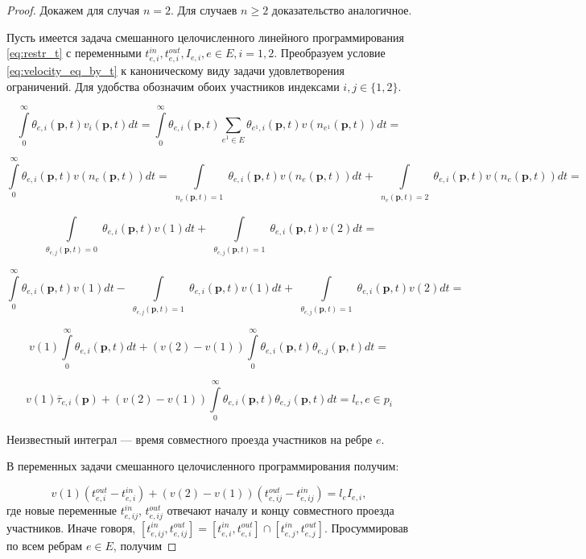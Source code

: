 \documentclass[12pt, a4paper]{article}
\begin{document}
\begin{proof}
	Докажем для случая $n = 2$. Для случаев $n \ge 2$ доказательство аналогичное.
	
	Пусть имеется задача смешанного целочисленного линейного программирования \eqref{eq:restr_t} с переменными $t_{e, i}^{in}, t_{e, i}^{out}, I_{e, i}, e \in E, i = 1, 2$. Преобразуем условие \eqref{eq:velocity_eq_by_t} к каноническому виду задачи удовлетворения ограничений. Для удобства обозначим обоих участников индексами $i, j \in \{1, 2\}$.
	
	$$\int\limits_{0}^{\infty} \theta_{e, i} (\textbf{p}, t) v_i(\textbf{p}, t)dt = \int\limits_{0}^{\infty} \theta_{e, i} (\textbf{p}, t) \sum \limits _{e^1 \in E} \theta_{e^1, i} (\textbf{p}, t) v (n_{e^1} (\textbf{p}, t)) dt = $$
	
	$$\int\limits_{0}^{\infty} \theta_{e, i} (\textbf{p}, t)  v (n_{e} (\textbf{p}, t)) dt = 
	  \int\limits_{ \substack{n_{e} (\textbf{p}, t) = 1}} \theta_{e, i} (\textbf{p}, t)  v (n_{e} (\textbf{p}, t)) dt +
	  \int\limits_{ \substack{n_{e} (\textbf{p}, t) = 2}} \theta_{e, i} (\textbf{p}, t)  v (n_{e} (\textbf{p}, t)) dt = $$
	
	$$\int\limits_{ \substack{\theta_{e, j} (\textbf{p}, t) = 0}} \theta_{e, i} (\textbf{p}, t)  v (1) dt +
	  \int\limits_{ \substack{\theta_{e, j} (\textbf{p}, t) = 1}} \theta_{e, i} (\textbf{p}, t)  v (2) dt = $$
	  
    $$\int\limits_{0}^{\infty} \theta_{e, i} (\textbf{p}, t)  v (1) dt - 
      \int\limits_{ \substack{\theta_{e, j} (\textbf{p}, t) = 1}} \theta_{e, i} (\textbf{p}, t)  v (1) dt +
	  \int\limits_{ \substack{\theta_{e, j} (\textbf{p}, t) = 1}} \theta_{e, i} (\textbf{p}, t)  v (2) dt = $$
	  
	$$v (1) \int\limits_{0}^{\infty} \theta_{e, i} (\textbf{p}, t) dt +
	  (v (2) - v(1)) \int\limits_{0}^{\infty} \theta_{e, i} (\textbf{p}, t) \theta_{e, j} (\textbf{p}, t) dt = $$
	  
    $$v (1) \overline{\tau}_{e, i} (\textbf{p}) +
    (v (2) - v(1)) \int\limits_{0}^{\infty} \theta_{e, i} (\textbf{p}, t) \theta_{e, j} (\textbf{p}, t) dt = l_e, e \in p_i$$
	  
	Неизвестный интеграл --- время совместного проезда участников на ребре $e$.
	  
	В переменных задачи смешанного целочисленного программирования получим:
	
	$$v(1) (t_{e, i}^{out} - t_{e, i}^{in}) + (v(2) - v(1)) (t_{e, ij}^{out} - t_{e, ij}^{in}) = l_e I_{e, i},$$
	где новые переменные $t_{e, ij}^{in}$, $t_{e, ij}^{out}$ отвечают началу и концу совместного проезда участников. Иначе говоря, $[t_{e, ij}^{in}, t_{e, ij}^{out}] = [t_{e, i}^{in}, t_{e, i}^{out}] \cap [t_{e, j}^{in}, t_{e, j}^{out}]$. Просуммировав по всем ребрам $e \in E$, получим
	

\end{proof}
\end{document}
